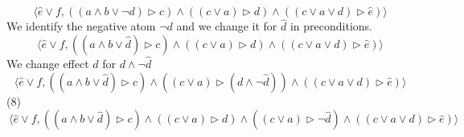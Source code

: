 \documentclass[12pt,a4paper]{article}
\begin{document}
	\[\ \langle \hat{e} \lor f, ((a \land b \lor \neg d) \triangleright c) \land ((c \lor a) \triangleright d) \land ((c \lor a \lor d) \triangleright \hat{e}) \rangle \]
	We identify the negative atom $\neg d$ and we change it for $\hat{d}$ in preconditions.
	\[\ \langle \hat{e} \lor f, ((a \land b \lor \hat{d}) \triangleright c) \land ((c \lor a) \triangleright d) \land ((c \lor a \lor d) \triangleright \hat{e}) \rangle \]
	We change effect $d$ for $d \land \neg \hat{d}$
	\[\ \langle \hat{e} \lor f, ((a \land b \lor \hat{d}) \triangleright c) \land ((c \lor a) \triangleright (d \land \neg\hat{d})) \land ((c \lor a \lor d) \triangleright \hat{e}) \rangle \]
	(8)
	\[\ \langle \hat{e} \lor f, ((a \land b \lor \hat{d}) \triangleright c) \land ((c \lor a) \triangleright d) \land ((c \lor a) \triangleright \neg\hat{d}) \land ((c \lor a \lor d) \triangleright \hat{e}) \rangle \]
\end{document}
